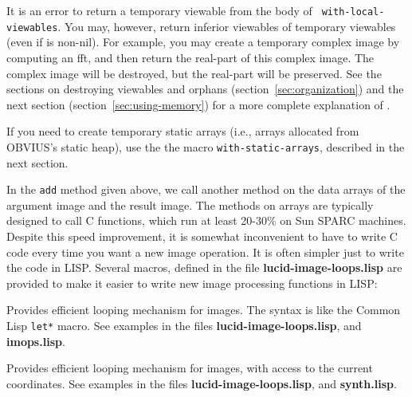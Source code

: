 It is an error to return a temporary viewable from the body of {\tt
with-local-viewables}.  You may, however, return inferior viewables of
temporary viewables (even if  is
non-nil).  For example, you may create a temporary complex image by
computing an fft, and then return the real-part of this complex image.
The complex image will be destroyed, but the real-part will be
preserved.  See the sections on destroying viewables and orphans
(section~\ref{sec:organization}) and the next section
(section~\ref{sec:using-memory}) for a more complete explanation of
.

If you need to create temporary static arrays (i.e., arrays allocated from
OBVIUS's static heap), use the the macro {\tt with-static-arrays},
described in the next section.

In the {\tt add} method given above, we call another method on the
data arrays of the argument image and the result image.  The methods
on arrays are typically designed to call C functions, which run at
least 20-30\% on Sun SPARC machines.  Despite this speed improvement,
it is somewhat inconvenient to have to write C code every time you
want a new image operation.  It is often simpler just to write the
code in LISP.  Several macros, defined in the file {\bf
lucid-image-loops.lisp} are provided to make it easier to write new
image processing functions in LISP:
\begin{description}
\item{}
Provides efficient looping mechanism for images.  The syntax is like
the Common Lisp {\tt let*} macro.  
See examples in the
files {\bf lucid-image-loops.lisp}, and {\bf imops.lisp}.

\item{}
Provides efficient looping mechanism for images, with access to the current
coordinates.  See examples in the
files {\bf lucid-image-loops.lisp}, and {\bf synth.lisp}.
\end{description}

